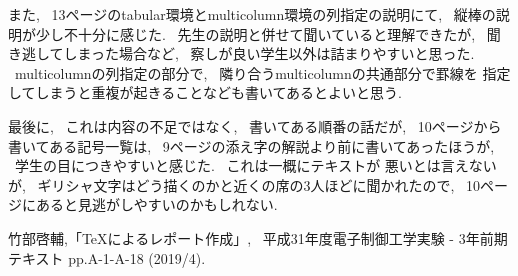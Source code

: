 \documentclass[titlepage]{jarticle}
\begin{document}
		また, ~13ページの{\ttyen}tabular環境と{\ttyen}multicolumn環境の列指定の説明にて,
		~縦棒の説明が少し不十分に感じた. ~先生の説明と併せて聞いていると理解できたが,
		~聞き逃してしまった場合など, ~察しが良い学生以外は詰まりやすいと思った.
		~{\ttyen}multicolumnの列指定の部分で, ~隣り合う{\ttyen}multicolumnの共通部分で罫線を
		指定してしまうと重複が起きることなども書いてあるとよいと思う.

		最後に, ~これは内容の不足ではなく, ~書いてある順番の話だが, ~10ページから書いてある記号一覧は,
		~9ページの添え字の解説より前に書いてあったほうが, ~学生の目につきやすいと感じた. ~これは一概にテキストが
		悪いとは言えないが, ~ギリシャ文字はどう描くのかと近くの席の3人ほどに聞かれたので,
		~10ページにあると見逃がしやすいのかもしれない.

\begin{thebibliography}{1}
	 竹部啓輔,「{\TeX}によるレポート作成」, ~平成31年度電子制御工学実験 - 3年前期テキスト
		pp.A-1-A-18 (2019/4).
\end{thebibliography}
\end{document}
